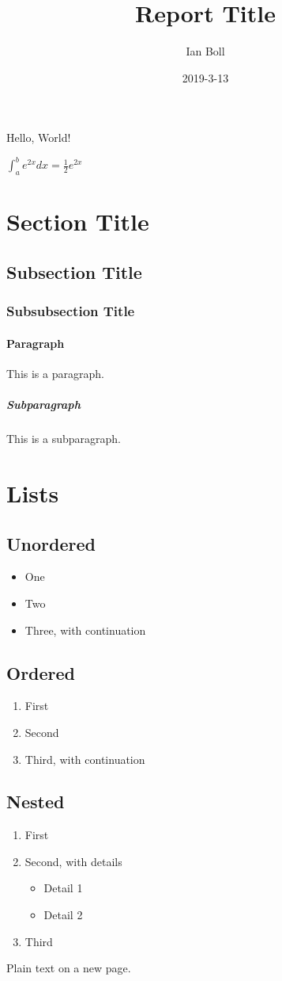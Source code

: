 \documentclass{article}
\title{Report Title}
\date{2019-3-13}
\author{Ian Boll}
\begin{document}
    \maketitle

    Hello, World!

    $\int_{a}^{b} e^{2x} dx=\frac{1}{2}e^{2x}$

    \section{Section Title}
    \subsection{Subsection Title}
    \subsubsection{Subsubsection Title}

    \paragraph{Paragraph}
    This is a paragraph.
    \subparagraph{Subparagraph}
    This is a subparagraph.

    \section{Lists}
    \subsection{Unordered}
    \begin{itemize}
        \item One
        \item Two
        \item Three,
            with continuation
    \end{itemize}
    \subsection{Ordered}
    \begin{enumerate}
        \item First
        \item Second
        \item Third,
            with continuation
    \end{enumerate}
    \subsection{Nested}
    \begin{enumerate}
        \item First
        \item Second, with details
        \begin{itemize}
            \item Detail 1
            \item Detail 2
        \end{itemize}
        \item Third
    \end{enumerate}

    \newpage
    Plain text on a new page.
\end{document}
